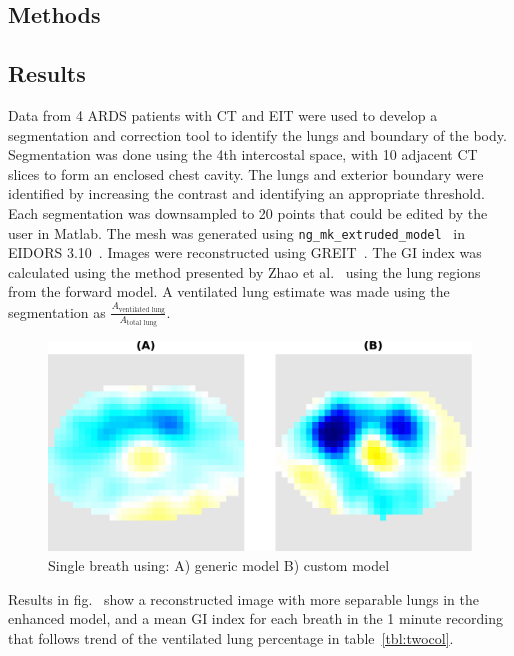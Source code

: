 \subsection{Methods}
\subsection{Results}
Data from 4 ARDS patients with CT
and EIT were used to develop a segmentation 
and correction tool to identify 
the lungs and boundary of the body.  
Segmentation was done using the 4th intercostal space, 
with 10 adjacent CT 
slices to form an enclosed chest cavity. 
The lungs
and exterior boundary were identified by increasing the contrast
and identifying an appropriate threshold.
Each segmentation was downsampled to
20 points that could be edited by the user in Matlab. The 
mesh was generated using 
\verb!ng_mk_extruded_model!~\cite{Grychtol2012} in EIDORS 
3.10~\cite{Adler2019}. Images were reconstructed 
using GREIT~\cite{Adler2009}. 
The GI index was calculated using the method
presented by Zhao et al.~\cite{Zhao2009} using the lung regions from the 
forward model. A ventilated lung estimate was made using the
segmentation as $\frac{A_{\text{ventilated lung}}}{A_{\text{total lung}}}$.

\begin{figure}
\centering
\includegraphics[width=\textwidth]{chapter_4/imgs/basic_vs_advanced_3_cropped.pdf}
\caption{\label{fig:ct_mesh_breath}%
Single breath using: A) generic model B) custom model
}
\end{figure}

Results in fig.~ show a reconstructed image 
with more separable lungs in the enhanced model, and a mean GI index for each breath in the 
1 minute 
recording that follows 
trend of the ventilated lung percentage in table~\ref{tbl:twocol}.

